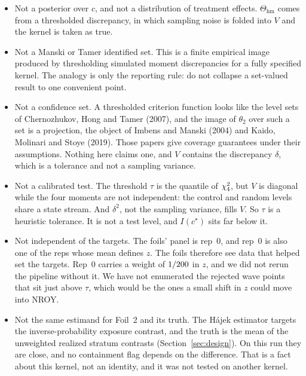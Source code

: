 \documentclass[11pt]{article}
\newcommand{\hm}{\mathrm{hm}}
\begin{document}
\begin{itemize}
  \item Not a posterior over $c$, and not a distribution of treatment
        effects. $\Theta_{\hm}$ comes from a thresholded discrepancy, in which
        sampling noise is folded into $V$ and the kernel is taken as
        true.
  \item Not a Manski or Tamer identified set. This is a finite
        empirical image produced by thresholding simulated moment
        discrepancies for a fully specified kernel. The analogy is only
        the reporting rule: do not collapse a set-valued result to one
        convenient point.
  \item Not a confidence set. A thresholded criterion function looks like
        the level sets of Chernozhukov, Hong and Tamer (2007), and the
        image of $\theta_2$ over such a set is a projection, the object of
        Imbens and Manski (2004) and Kaido, Molinari and Stoye (2019).
        Those papers give coverage guarantees under their
        assumptions. Nothing here claims one, and $V$ contains the
        discrepancy $\delta$, which is a tolerance and not a sampling variance.
  \item Not a calibrated test. The threshold $\tau$ is the
        \Confidence{} quantile of $\chi^2_{4}$, but $V$ is diagonal while
        the four moments are not independent: the control and random levels
        share a state stream. And $\delta^2$, not the sampling variance, fills
        $V$. So $\tau$ is a heuristic tolerance. It is not a test level, and
        $I(c^\star)$ sits far below it.
  \item Not independent of the targets. The foils' panel is rep~0, and rep~0
        is also one of the \RepsZ{} reps whose mean defines $z$. The foils
        therefore see data that helped set the targets. Rep~0 carries a
        weight of $1/200$ in $z$, and we did not rerun the pipeline
        without it. We have not enumerated the rejected wave points that sit
        just above $\tau$, which would be the ones a small shift in $z$ could
        move into NROY.
  \item Not the same estimand for Foil~2 and its truth. The Hájek estimator
        targets the inverse-probability exposure contrast, and the truth is
        the mean of the unweighted realized stratum contrasts
        (Section~\ref{sec:design}). On this run they are close, and no
        containment flag depends on the difference. That is a fact about this
        kernel, not an identity, and it was not tested on another kernel.

\end{itemize}
\end{document}
